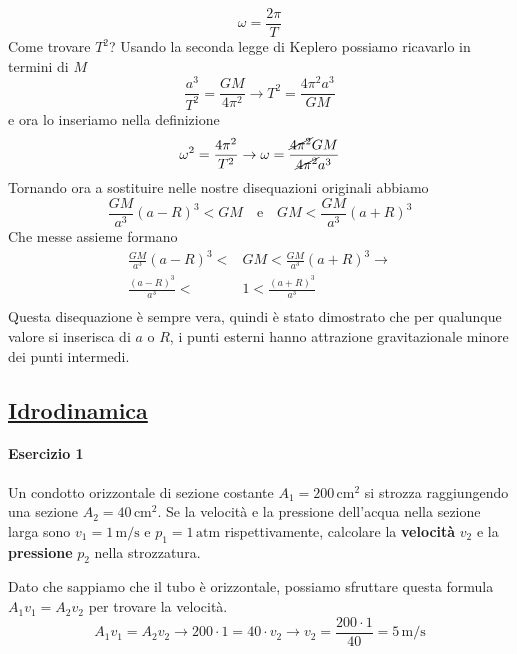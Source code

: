 \begin{equation*}
\omega=\frac{2\pi}{T}
\end{equation*}
Come trovare $T^2$? Usando la seconda legge di Keplero possiamo ricavarlo in termini di $M$
\begin{equation*}
\frac{a^3}{T^2} = \frac{GM}{4\pi^2} \rightarrow T^2 = \frac{4\pi^2a^3}{GM}
\end{equation*}
e ora lo inseriamo nella definizione
\begin{equation*}
\omega^2=\frac{4\pi^2}{T^2} \rightarrow \omega=\frac{\cancel{4\pi^2}GM}{\cancel{4\pi^2}a^3}
\end{equation*}
Tornando ora a sostituire nelle nostre disequazioni originali abbiamo
\begin{equation*}
\frac{GM}{a^3}(a-R)^3<GM\quad\text{e}\quad GM<\frac{GM}{a^3}(a+R)^3
\end{equation*}
Che messe assieme formano
\begin{align*}
\frac{GM}{a^3}(a-R)^3<&GM<\frac{GM}{a^3}(a+R)^3\rightarrow\\
\frac{(a-R)^3}{a^3}<&1<\frac{(a+R)^3}{a^3}\\
\end{align*}
Questa disequazione è sempre vera, quindi è stato dimostrato che per qualunque valore si inserisca di
$a$ o $R$, i punti esterni hanno attrazione gravitazionale minore dei punti intermedi.

\subsection*{\hyperref[sec:idrodinamica]{Idrodinamica}}\label{ex:idrodinamica}
\paragraph{Esercizio 1}
Un condotto orizzontale di sezione costante $A_1 = 200\,\text{cm}^2$ si strozza raggiungendo una 
sezione $A_2 = 40\,\text{cm}^2$. Se la velocità e la pressione dell'acqua nella sezione larga sono 
$v_1 = 1\,\text{m/s}$ e $p_1 = 1\,\text{atm}$ rispettivamente, calcolare la \textbf{velocità} $v_2$ e 
la \textbf{pressione} $p_2$ nella strozzatura.
\divisor

Dato che sappiamo che il tubo è orizzontale, possiamo sfruttare questa formula $A_1v_1=A_2v_2$ per
trovare la velocità.
\begin{equation*}
A_1v_1 = A_2v_2 \rightarrow 200\cdot 1 = 40\cdot v_2 \rightarrow v_2 = \frac{200\cdot1}{40} = 
\boxed{5\,\text{m/s}}
\end{equation*}

